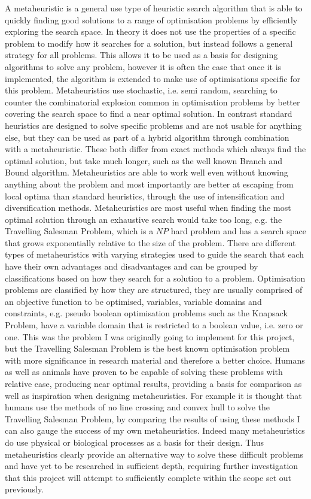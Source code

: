 \documentclass[]{final_report}
\begin{document}
A metaheuristic is a general use type of heuristic search algorithm that is able to quickly finding good solutions to a range of optimisation problems by efficiently exploring the search space. In theory it does not use the properties of a specific problem to modify how it searches for a solution, but instead follows a general strategy for all problems. This allows it to be used as a basis for designing algorithms to solve any problem, however it is often the case that once it is implemented, the algorithm is extended to make use of optimisations specific for this problem. Metaheuristics use stochastic, i.e. semi random, searching to counter the combinatorial explosion common in optimisation problems by better covering the search space to find a near optimal solution. In contrast standard heuristics are designed to solve specific problems and are not usable for anything else, but they can be used as part of a hybrid algorithm through combination with a metaheuristic. These both differ from exact methods which always find the optimal solution, but take much longer, such as the well known Branch and Bound algorithm. Metaheuristics are able to work well even without knowing anything about the problem and most importantly are better at escaping from local optima than standard heuristics, through the use of intensification and diversification methods. Metaheuristics are most useful when finding the most optimal solution through an exhaustive search would take too long, e.g. the Travelling Salesman Problem, which is a $NP$ hard problem and has a search space that grows exponentially relative to the size of the problem. There are different types of metaheuristics with varying strategies used to guide the search that each have their own advantages and disadvantages and can be grouped by classifications based on how they search for a solution to a problem. Optimisation problems are classified by how they are structured, they are usually comprised of an objective function to be optimised, variables, variable domains and constraints, e.g. pseudo boolean optimisation problems such as the Knapsack Problem, have a variable domain that is restricted to a boolean value, i.e. zero or one. This was the problem I was originally going to implement for this project, but the Travelling Salesman Problem is the best known optimisation problem with more significance in research material and therefore a better choice. Humans as well as animals have proven to be capable of solving these problems with relative ease, producing near optimal results, providing a basis for comparison as well as inspiration when designing metaheuristics. For example it is thought that humans use the methods of no line crossing and convex hull to solve the Travelling Salesman Problem, by comparing the results of using these methods I can also gauge the success of my own metaheuristics. Indeed many metaheuristics do use physical or biological processes as a basis for their design. Thus metaheuristics clearly provide an alternative way to solve these difficult problems and have yet to be researched in sufficient depth, requiring further investigation that this project will attempt to sufficiently complete within the scope set out previously.
\end{document}
